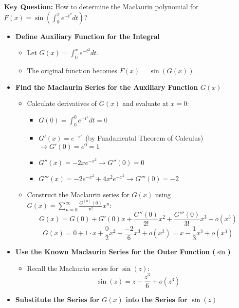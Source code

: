 \hfill

\begin{cascade}
	\textbf{Key Question:} How to determine the Maclaurin polynomial for $F(x) = \sin\left(\int_0^x e^{-t^2} dt\right)$?
	\begin{itemize}
		\item \textbf{Define Auxiliary Function for the Integral}
		      \begin{itemize}
			      \item Let $G(x) = \int_0^x e^{-t^2} dt$.
			      \item The original function becomes $F(x) = \sin(G(x))$.
		      \end{itemize}
		\item \textbf{Find the Maclaurin Series for the Auxiliary Function $G(x)$}
		      \begin{itemize}
			      \item Calculate derivatives of $G(x)$ and evaluate at $x=0$:
			            \begin{itemize}
				            \item $G(0) = \int_0^0 e^{-t^2} dt = 0$
				            \item $G'(x) = e^{-x^2}$ (by Fundamental Theorem of Calculus) $\rightarrow G'(0) = e^0 = 1$
				            \item $G''(x) = -2x e^{-x^2} \rightarrow G''(0) = 0$
				            \item $G'''(x) = -2e^{-x^2} + 4x^2 e^{-x^2} \rightarrow G'''(0) = -2$
			            \end{itemize}
			      \item Construct the Maclaurin series for $G(x)$ using $G(x) = \sum_{n=0}^{\infty} \frac{G^{(n)}(0)}{n!}x^n$:
			            \[ G(x) = G(0) + G'(0)x + \frac{G''(0)}{2!}x^2 + \frac{G'''(0)}{3!}x^3 + o(x^3) \]
			            \[ G(x) = 0 + 1 \cdot x + \frac{0}{2}x^2 + \frac{-2}{6}x^3 + o(x^3) = x - \frac{1}{3}x^3 + o(x^3) \]
		      \end{itemize}
		\item \textbf{Use the Known Maclaurin Series for the Outer Function ($\sin$)}
		      \begin{itemize}
			      \item Recall the Maclaurin series for $\sin(z)$:
			            \[ \sin(z) = z - \frac{z^3}{6} + o(z^3) \]
		      \end{itemize}
		\item \textbf{Substitute the Series for $G(x)$ into the Series for $\sin(z)$}

\end{itemize}
\end{cascade}
